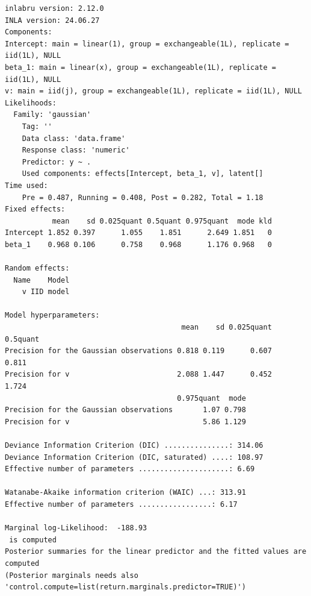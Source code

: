 \documentclass[
  letterpaper,
  DIV=11,
  numbers=noendperiod]{scrartcl}
\begin{document}
\begin{verbatim}
inlabru version: 2.12.0
INLA version: 24.06.27
Components:
Intercept: main = linear(1), group = exchangeable(1L), replicate = iid(1L), NULL
beta_1: main = linear(x), group = exchangeable(1L), replicate = iid(1L), NULL
v: main = iid(j), group = exchangeable(1L), replicate = iid(1L), NULL
Likelihoods:
  Family: 'gaussian'
    Tag: ''
    Data class: 'data.frame'
    Response class: 'numeric'
    Predictor: y ~ .
    Used components: effects[Intercept, beta_1, v], latent[]
Time used:
    Pre = 0.487, Running = 0.408, Post = 0.282, Total = 1.18 
Fixed effects:
           mean    sd 0.025quant 0.5quant 0.975quant  mode kld
Intercept 1.852 0.397      1.055    1.851      2.649 1.851   0
beta_1    0.968 0.106      0.758    0.968      1.176 0.968   0

Random effects:
  Name    Model
    v IID model

Model hyperparameters:
                                         mean    sd 0.025quant 0.5quant
Precision for the Gaussian observations 0.818 0.119      0.607    0.811
Precision for v                         2.088 1.447      0.452    1.724
                                        0.975quant  mode
Precision for the Gaussian observations       1.07 0.798
Precision for v                               5.86 1.129

Deviance Information Criterion (DIC) ...............: 314.06
Deviance Information Criterion (DIC, saturated) ....: 108.97
Effective number of parameters .....................: 6.69

Watanabe-Akaike information criterion (WAIC) ...: 313.91
Effective number of parameters .................: 6.17

Marginal log-Likelihood:  -188.93 
 is computed 
Posterior summaries for the linear predictor and the fitted values are computed
(Posterior marginals needs also 'control.compute=list(return.marginals.predictor=TRUE)')
\end{verbatim}
\end{document}
